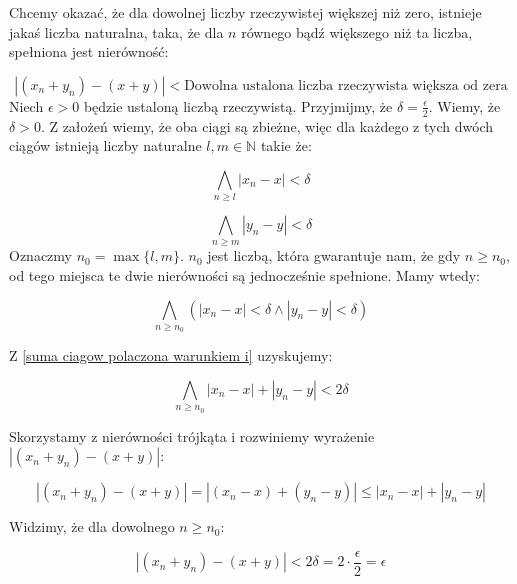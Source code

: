 \documentclass[a4paper,oneside,openright,11pt]{article}
\numberwithin{equation}{section}
\begin{document}
\noindent
Chcemy okazać, że dla dowolnej liczby rzeczywistej większej niż zero, istnieje jakaś liczba naturalna, taka, że dla $n$ równego bądź większego niż ta liczba, spełniona jest nierówność:

\begin{equation*}
    |(x_{n} + y_{n}) - (x + y)| < \textrm{Dowolna ustalona liczba rzeczywista większa od zera}
\end{equation*}
\noindent
Niech $\epsilon > 0$ będzie ustaloną liczbą rzeczywistą. Przyjmijmy, że $\delta = \frac{\epsilon}{2}$. Wiemy, że $\delta > 0$. Z założeń wiemy, że oba ciągi są zbieżne, więc dla każdego z tych dwóch ciągów
istnieją liczby naturalne $l, m \in \mathbb{N}$ takie że:


\begin{equation*}
    \bigwedge_{n \geq l} |x_{n} - x| < \delta 
\end{equation*}

\begin{equation*}
    \bigwedge_{n \geq m} |y_{n} - y| < \delta 
\end{equation*}
Oznaczmy $n_0 = \max \{l, m\}$. $n_0$ jest liczbą, która gwarantuje nam, że gdy $n \geq n_0$, od tego miejsca te dwie nierówności
są jednocześnie spełnione. Mamy wtedy:

\begin{equation} \label{suma ciagow polaczona warunkiem i}
    \bigwedge_{n \geq n_0} (|x_{n} - x| < \delta \wedge |y_{n} - y| < \delta)
\end{equation}


Z \ref{suma ciagow polaczona warunkiem i} uzyskujemy:

\begin{equation} \label{mniejsze niz dwa delta}
    \bigwedge_{n \geq n_0} |x_n - x| + |y_n - y| < 2 \delta
\end{equation}

Skorzystamy z nierówności trójkąta i rozwiniemy wyrażenie $|(x_{n} + y_{n}) - (x + y)|$:

\begin{equation*}
    |(x_{n} + y_{n}) - (x + y)| = |(x_{n} - x) + (y_{n} - y)| \leq |x_n - x| + |y_n - y| 
\end{equation*}

Widzimy, że dla dowolnego $n \geq n_0$:

\begin{equation*}
    |(x_{n} + y_{n}) - (x + y)| < 2 \delta = 2 \cdot \frac{\epsilon}{2} = \epsilon
\end{equation*}
\end{document}
